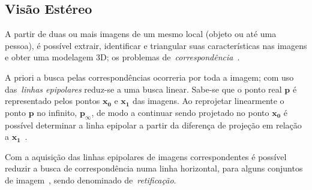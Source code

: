 \subsection{Visão Estéreo}
    \label{subsec:intro_stereo}
A partir de duas ou mais imagens de um mesmo local (objeto ou até uma pessoa), é possível extrair, identificar e triangular suas características nas imagens e obter uma modelagem 3D; os problemas de~\emph{correspondência}~\cite{FergusL1}.

A priori a busca pelas correspondências ocorreria por toda a imagem; com uso das~\emph{linhas epipolares} reduz-se a uma busca linear. 
Sabe-se
que o ponto real $\mathbf{p}$ é representado pelos pontos $\mathbf{x_0}$ e $\mathbf{x_1}$ das imagens. Ao reprojetar linearmente o ponto $\mathbf{p}$ no infinito, $\mathbf{p_{\infty}}$, de modo a continuar sendo projetado no ponto $\mathbf{x_0}$ é possível determinar a linha epipolar a partir da diferença de projeção em relação a $\mathbf{x_1}$~\cite{Szeliski2012}.


Com a aquisição das linhas epipolares de imagens correspondentes é possível reduzir a busca de correspondência numa linha horizontal, para alguns conjuntos de imagem~\cite{Szeliski2012}, 
sendo denominado de~\emph{retificação}.


